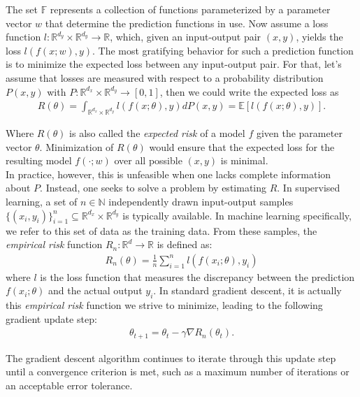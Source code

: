 The set \(\mathbb{F}\) represents a collection of functions parameterized by a parameter vector \( w \) that determine the prediction functions in use.
Now assume a loss function \( l : \mathbb{R}^{d_y} \times \mathbb{R}^{d_y} \to \mathbb{R} \), which, given an input-output pair \((x, y)\), yields the loss \( l(f(x; w), y) \).
The most gratifying behavior for such a prediction function is to minimize the expected loss between any input-output pair.
For that, let's assume that losses are measured with respect to a probability distribution $P(x,y)$ with $ P : \mathbb{R}^{d_x} \times \mathbb{R}^{d_y} \to [0, 1] $,
then we could write the expected loss as
\begin{align}
R(\theta) = \int_{\mathbb{R}^{d_x} \times \mathbb{R}^{d_y}} l(f(x; \theta), y) dP(x, y) = \mathbb{E}[l(f(x; \theta), y)].
\end{align}

Where $R(\theta)$ is also called the \emph{expected risk} of a model $f$ given the parameter vector $\theta$. 
Minimization of $R(\theta)$ would ensure that the expected loss for the resulting model $f(\cdot; w) $ over all possible $(x, y)$ is minimal.\\
In practice, however, this is unfeasible when one lacks complete information about $P$.
Instead, one seeks to solve a problem by estimating \( R \).
In supervised learning, a set of \( n \in \mathbb{N} \) independently drawn input-output
samples \(\{ (x_i, y_i) \}_{i=1}^{n} \subseteq \mathbb{R}^{d_x} \times \mathbb{R}^{d_y}\) is typically available.
In machine learning specifically, we refer to this set of data as the training data.
From these samples, the \emph{empirical risk} function \( R_n : \mathbb{R}^d \to \mathbb{R} \) is defined as:
\begin{align}
R_n(\theta) = \frac{1}{n} \sum_{i=1}^{n} l(f(x_i; \theta), y_i)
\end{align}
where \( l \) is the loss function that measures the discrepancy between the prediction \( f(x_i; \theta) \) and the actual output \( y_i \).
In standard gradient descent, it is actually this \emph{empirical risk} function we strive to minimize, leading to the following gradient update step:
\begin{align}
    \theta_{t+1} = \theta_t - \gamma \nabla R_n(\theta_t).
\end{align}

The gradient descent algorithm continues to iterate through this update step until a convergence criterion is met, such as a maximum number of iterations or an acceptable error tolerance.
